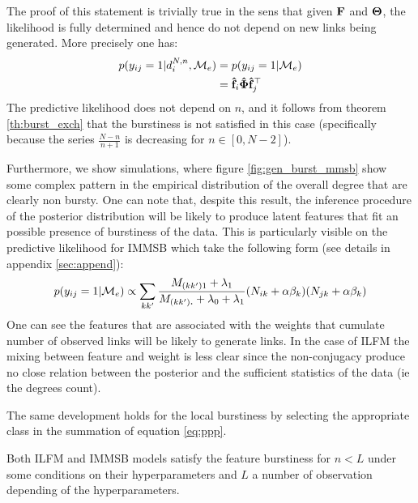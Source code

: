 The proof of this statement is trivially true in the sens that given $\mathbf{F}$ and $\mathbf{\Theta}$, the likelihood is fully determined and hence do not depend on new links being generated. More precisely one has:
\begin{align}
p(y_{ij}=1| d_i^{N,n}, \mathcal{M}_e) &= p(y_{ij}=1| \mathcal{M}_e)\\
&= \mathbf{\hat{f}}_{i} \mathbf{\hat{\Phi}} \mathbf{\hat{f}}_j^\top
\end{align}
The predictive likelihood does not depend on $n$, and it follows from theorem \ref{th:burst_exch} that the burstiness is not satisfied in this case (specifically because the series $\frac{N-n}{n+1}$ is decreasing for $n\in [0, N-2]$).

Furthermore, we show simulations, where figure \ref{fig:gen_burst_mmsb} show some complex pattern in the empirical distribution of the overall degree that are clearly non bursty. One can note that, despite this result, the inference procedure of the posterior distribution will be likely to produce latent features that fit an possible presence of burstiness of the data. This is particularly visible on the predictive likelihood for IMMSB which take the following form (see details in appendix \ref{sec:append}):
\begin{equation} \label{eq:ppp}
p(y_{ij}=1 | \M_e)\propto \sum_{kk'} \frac{M_{(kk')1} + \lambda_1}{M_{(kk')\bm{.}} + \lambda_0 + \lambda_1}  (N_{ik} + \alpha\beta_k ) (N_{jk} + \alpha\beta_k)
\end{equation}   
One can see the features that are associated with the weights that cumulate number of observed links will be likely to generate links. In the case of ILFM the mixing between feature and weight is less clear since the non-conjugacy produce no close relation between the posterior and the sufficient statistics of the data (ie the degrees count). 

The same development holds for the local burstiness by selecting the appropriate class in the summation of equation \eqref{eq:ppp}.
\begin{proposition} \label{prop:diaconis}
	Both ILFM and IMMSB models satisfy the feature burstiness for $n < L$ under some conditions on their hyperparameters  and $L$ a number of observation depending of the hyperparameters.
\end{proposition}

